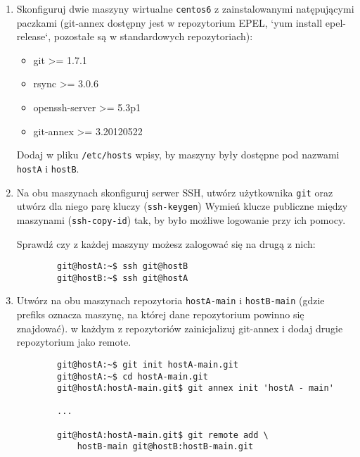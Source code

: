 \documentclass[polish]{article}
\begin{document}
\begin{enumerate}

    \item
    Skonfiguruj dwie maszyny wirtualne \texttt{centos6} z zainstalowanymi
    natępującymi paczkami (git-annex dostępny jest w repozytorium EPEL,
    `yum install epel-release`, pozostałe są w standardowych repozytoriach):

    \begin{itemize}

      \item git >= 1.7.1
      \item rsync >= 3.0.6
      \item openssh-server >= 5.3p1
      \item git-annex >= 3.20120522
    \end{itemize}

    Dodaj w pliku \texttt{/etc/hosts} wpisy, by maszyny były dostępne pod
    nazwami \texttt{hostA} i \texttt{hostB}.

    \item
    Na obu maszynach skonfiguruj serwer SSH, utwórz użytkownika \texttt{git}
    oraz utwórz dla niego parę kluczy (\texttt{ssh-keygen}) Wymień klucze
    publiczne między maszynami (\texttt{ssh-copy-id}) tak, by było możliwe
    logowanie przy ich pomocy.

    Sprawdź czy z każdej maszyny możesz zalogować się na drugą z nich:

    \begin{lstlisting}
        git@hostA:~$ ssh git@hostB
        git@hostB:~$ ssh git@hostA
    \end{lstlisting}

    \item
    Utwórz na obu maszynach repozytoria \texttt{hostA-main} i
    \texttt{hostB-main} (gdzie prefiks oznacza maszynę, na której dane
    repozytorium powinno się znajdować). w każdym z repozytoriów zainicjalizuj
    git-annex i dodaj drugie repozytorium jako remote.

    \begin{lstlisting}
        git@hostA:~$ git init hostA-main.git
        git@hostA:~$ cd hostA-main.git
        git@hostA:hostA-main.git$ git annex init 'hostA - main'

        ...

        git@hostA:hostA-main.git$ git remote add \
            hostB-main git@hostB:hostB-main.git
    \end{lstlisting}


\end{enumerate}
\end{document}
